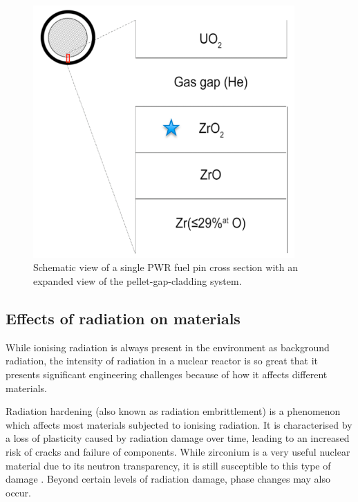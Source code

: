 \begin{figure}[ht]
\centering
\includegraphics[width=10cm]{images/gas_gap.png}
\caption{Schematic view of a single PWR fuel pin cross section with an expanded view of the pellet-gap-cladding system.}
\label{figure:gas_gap}
\end{figure}


\subsection{Effects of radiation on materials} 

While ionising radiation is always present in the environment as background radiation, the intensity of radiation in a nuclear reactor is so great that it presents significant engineering challenges because of how it affects different materials.

Radiation hardening (also known as radiation embrittlement) is a phenomenon which affects most materials subjected to ionising radiation. It is characterised by a loss of plasticity caused by radiation damage over time, leading to an increased risk of cracks and failure of components. While zirconium is a very useful nuclear material due to its neutron transparency, it is still susceptible to this type of damage \cite{Wisner1998}. Beyond certain levels of radiation damage, phase changes may also occur. %

